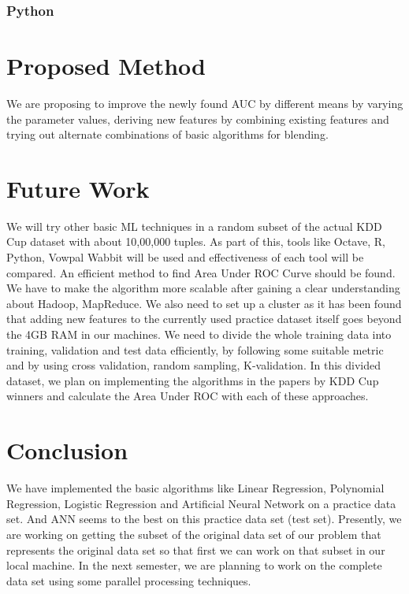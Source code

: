 \documentclass[10pt]{article}
\begin{document}
\subsubsection{Python}

\section{Proposed Method}
We are proposing to improve the newly found AUC by different means by varying the parameter values, deriving new features by combining existing features and trying out alternate combinations of basic algorithms for blending.
\section{Future Work}
We will try other basic ML techniques in a random subset of the actual KDD Cup dataset with about 10,00,000 tuples. As part of this, tools like Octave, R, Python, Vowpal Wabbit will be used and effectiveness of each tool will be compared. An efficient method to find Area Under ROC Curve should be found. We have to make the algorithm more scalable after gaining a clear understanding about Hadoop, MapReduce. We also need to set up a cluster as it has been found that adding new features to the currently used practice dataset itself goes beyond the 4GB RAM in our machines. We need to divide the whole training data into training, validation and test data efficiently, by following some suitable metric and by using cross validation, random sampling, K­-validation. In this divided dataset, we plan on implementing the algorithms in the papers by KDD Cup winners and calculate the Area Under ROC with each of these approaches.
\section{Conclusion}
We have implemented the basic algorithms like Linear Regression, Polynomial Regression, Logistic Regression and Artificial Neural Network on a practice data set. And ANN seems to the best on this practice data set (test set). Presently, we are working on getting the subset of the original data set of our problem that represents the original data set so that first we can work on that subset in our local machine. In the next semester, we are planning to work on the complete data set using some parallel processing techniques.
\end{document}
